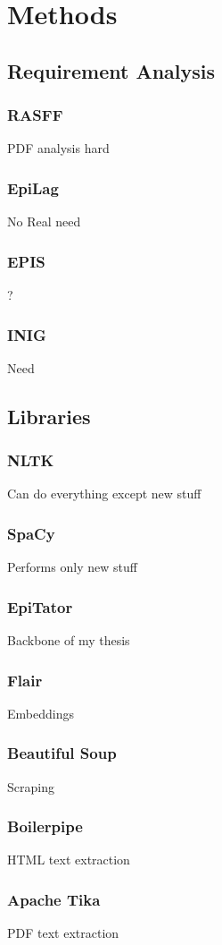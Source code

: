 \chapter{Methods}

\section{Requirement Analysis}
\subsection{RASFF}
PDF analysis hard
\subsection{EpiLag}
No Real need
\subsection{EPIS}
?
\subsection{INIG}
Need


\section{Libraries}
\subsection{NLTK}
Can do everything except new stuff
\subsection{SpaCy}
Performs only new stuff
\subsection{EpiTator}
Backbone of my thesis
\subsection{Flair}
Embeddings
\subsection{Beautiful Soup}
Scraping
\subsection{Boilerpipe}
HTML text extraction
\subsection{Apache Tika}
PDF text extraction

